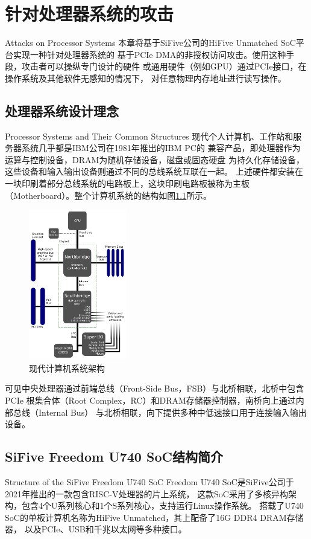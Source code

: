 
\chapter{针对处理器系统的攻击}{Attacks on Processor Systems}
本章将基于SiFive公司的HiFive Unmatched SoC平台实现一种针对处理器系统的
基于PCIe DMA的非授权访问攻击。使用这种手段，攻击者可以操纵专门设计的硬件
或通用硬件（例如GPU）通过PCIe接口，在操作系统及其他软件无感知的情况下，
对任意物理内存地址进行读写操作。

\section{处理器系统设计理念}{Processor Systems and Their Common Structures} \label{sec:ps-struct}
现代个人计算机、工作站和服务器系统几乎都是IBM公司在1981年推出的IBM PC的
兼容产品，即处理器作为运算与控制设备，DRAM为随机存储设备，磁盘或固态硬盘
为持久化存储设备，这些设备和输入输出设备则通过不同的总线系统互联在一起。
上述硬件都安装在一块印刷着部分总线系统的电路板上，这块印刷电路板被称为主板
（Motherboard）。整个计算机系统的结构如图\ref{fig:mb-diag}所示。

\begin{figure}[ht]
	\centering
	\includegraphics[width=0.38\textwidth]{figs/motherboard_diagram.pdf}
	\caption{现代计算机系统架构\cite{wiki:mb-fig}}
	\label{fig:mb-diag}
\end{figure}

可见中央处理器通过前端总线（Front-Side Bus，FSB）与北桥相联，北桥中包含PCIe
根集合体（Root Complex，RC）和DRAM存储器控制器，南桥向上通过内部总线（Internal Bus）
与北桥相联，向下提供多种中低速接口用于连接输入输出设备。

\section{SiFive Freedom U740 SoC结构简介}{Structure of the SiFive Freedom U740 SoC} \label{sec:u740-struct}
Freedom U740 SoC是SiFive公司于2021年推出的一款包含RISC-V处理器的片上系统，
这款SoC采用了多核异构架构，包含4个U系列核心和1个S系列核心，支持运行Linux操作系统。
搭载了U740 SoC的单板计算机名称为HiFive Unmatched，其上配备了16G DDR4 DRAM存储器，
以及PCIe、USB和千兆以太网等多种接口。

